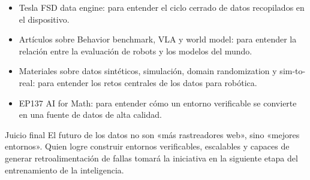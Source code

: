 \documentclass[a4paper]{article}
\begin{document}
\begin{itemize}
\item Tesla FSD data engine: para entender el ciclo cerrado de datos recopilados en el dispositivo.
\item Artículos sobre Behavior benchmark, VLA y world model: para entender la relación entre la evaluación de robots y los modelos del mundo.
\item Materiales sobre datos sintéticos, simulación, domain randomization y sim-to-real: para entender los retos centrales de los datos para robótica.
\item EP137 AI for Math: para entender cómo un entorno verificable se convierte en una fuente de datos de alta calidad.
\end{itemize}

\begin{importantbox}{Juicio final}
El futuro de los datos no son «más rastreadores web», sino «mejores entornos». Quien logre construir entornos verificables, escalables y capaces de generar retroalimentación de fallas tomará la iniciativa en la siguiente etapa del entrenamiento de la inteligencia.
\end{importantbox}
\end{document}
